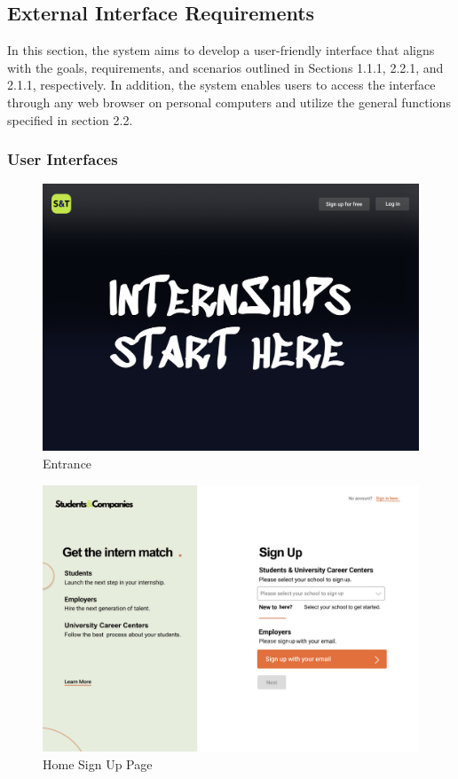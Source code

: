 \documentclass{article}
\begin{document}
\subsection{External Interface Requirements}
In this section, the system aims to develop a user-friendly interface that aligns with the goals, requirements, and scenarios outlined in Sections 1.1.1, 2.2.1, and 2.1.1, respectively. In addition, the system enables users to access the interface through any web browser on personal computers and utilize the general functions specified in section 2.2.
\subsubsection{User Interfaces}
\begin{figure}[H]
    \centering
    \includegraphics[scale = 0.40]{figures/UserInterfaces/General/Entrance.png}
    \caption{Entrance}
    \centering
\end{figure}
\begin{figure}[H]
    \centering
    \includegraphics[scale = 0.40]{figures/UserInterfaces/General/HomeSignUp.png}
    \caption{Home Sign Up Page}
    \centering
\end{figure}
\end{document}
